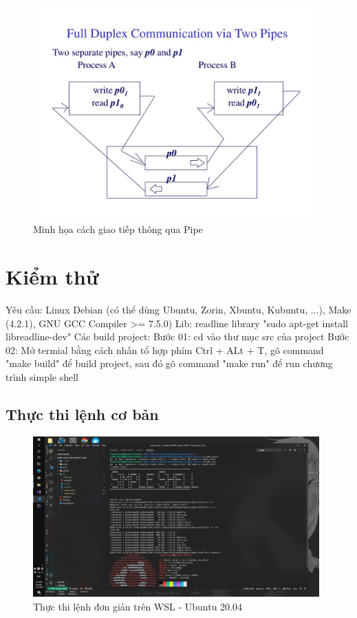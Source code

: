 \documentclass{article}
\begin{document}
\begin{figure}[H]
\centering
\includegraphics[width=0.98\textwidth]{pipe.jpg}
\caption{Minh họa cách giao tiếp thông qua Pipe}
\end{figure}

\section{Kiểm thử}

Yêu cầu: Linux Debian (có thể dùng Ubuntu, Zorin, Xbuntu, Kubuntu, ...), Make (4.2.1), GNU GCC Compiler >= 7.5.0)\newline
Lib: readline library "sudo apt-get install libreadline-dev"\newline
Các build project:\newline
Bước 01: cd vào thư mục src của project\newline
Bước 02: Mở termial bằng cách nhấn tổ hợp phím Ctrl + ALt + T, gõ command "make build" để build project, sau đó gõ command "make run" để run chương trình simple shell\newline

\subsection{Thực thi lệnh cơ bản}

\begin{figure}[H]
\centering
\includegraphics[width=0.98\textwidth]{wsl_simple_command.png}
\caption{Thực thi lệnh đơn giản trên WSL - Ubuntu 20.04}
\end{figure}
\end{document}
